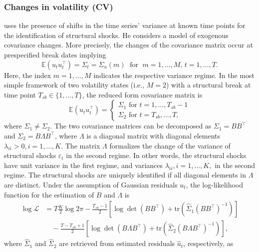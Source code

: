 \documentclass[nojss]{jss}\usepackage[]{graphicx}\usepackage[]{color}
\begin{document}
\subsubsection{Changes in volatility (CV)}\label{cv}

\cite{Rigobon2003} uses the presence of shifts in the time series' variance at known time points for the identification of structural shocks. He considers a model of exogenous covariance changes. More precisely, the changes of the covariance matrix occur at prespecified break dates implying
$$
\mathbb{E}(u_tu_t^\top) = \Sigma_t = \Sigma_u(m) \; \mbox{ for } \; m = 1,...,M,\, t=1,\ldots,T.
$$
Here, the index $m=1,\ldots,M$ indicates the respective variance regime. In the most simple framework of two volatility states (i.e., $M = 2$) with a structural break at time point $T_{sb}\in\{1,\ldots,T\}$, the reduced form covariance matrix is
$$
\mathbb{E}(u_tu_t^\top) =
\begin{cases}
\Sigma_1 \mbox{ for } t = 1,...,T_{sb}-1\\
\Sigma_2 \mbox{ for } t = T_{sb},...,T,
\end{cases}
$$
where $\Sigma_1 \neq \Sigma_2$. The two covariance matrices can be decomposed as $\Sigma_1 = BB^\top$ and $\Sigma_2 = B\Lambda B^\top$, where %
$\Lambda$ is a diagonal matrix with diagonal elements $\lambda_{ii} > 0, i = 1,...,K$. The matrix $\Lambda$ formalizes the change of the variance of structural shocks $\varepsilon_t$ in the second regime. In other words, the structural shocks have unit variance in the first regime, and variances $\lambda_{ii}, i=1,\ldots,K,$ in the second regime. The structural shocks are uniquely identified if all diagonal elements in $\Lambda$ are distinct. Under the assumption of Gaussian residuals $u_t$, the log-likelihood function for the estimation of $B$ and $\Lambda$ is
\begin{align}
\log \mathcal{L} &= T\frac{K}{2}\log 2\pi - \frac{T_{sb} - 1}{2}\left[\log \det(BB^\top) + \text{tr}\left(\widehat{\Sigma}_1(BB^\top)^{-1}\right)\right] \nonumber \\
                 &\quad - \frac{T - T_{sb} + 1}{2}\left[\log \det(B \Lambda B^\top) + \text{tr}\left(\widehat{\Sigma}_2(B \Lambda B^\top)^{-1}\right)\right],\label{lik_cv}
\end{align}
where $\widehat{\Sigma}_1$ and $\widehat{\Sigma}_2$ are retrieved from estimated residuals $\widehat{u}_t$, respectively, as
\end{document}
